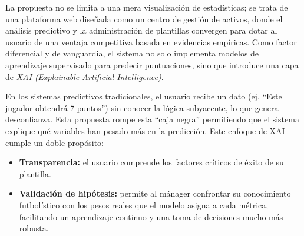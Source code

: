 La propuesta no se limita a una mera visualización de estadísticas; se trata de una plataforma web 
diseñada como un centro de gestión de activos, donde el análisis predictivo y la administración de 
plantillas convergen para dotar al usuario de una ventaja competitiva basada en evidencias empíricas.
Como factor diferencial y de vanguardia, el sistema no solo implementa modelos de aprendizaje 
supervisado para predecir puntuaciones, sino que introduce una capa de \textit{XAI (Explainable Artificial Intelligence)}.

En los sistemas predictivos tradicionales, el usuario recibe un dato (ej. ``Este jugador obtendrá 
7 puntos'') sin conocer la lógica subyacente, lo que genera desconfianza.
Esta propuesta rompe esta ``caja negra'' permitiendo que el sistema explique qué variables han 
pesado más en la predicción.
Este enfoque de XAI cumple un doble propósito:

\begin{sloppypar}
\begin{itemize}
\item \textbf{Transparencia:} el usuario comprende los factores críticos de éxito de su plantilla.
\item \textbf{Validación de hipótesis:} permite al mánager confrontar su conocimiento futbolístico 
con los pesos reales que el modelo asigna a cada métrica, facilitando un aprendizaje continuo y una 
toma de decisiones mucho más robusta.
\end{itemize}
\end{sloppypar}

